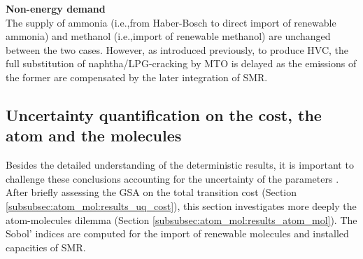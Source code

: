 \documentclass[11pt,twoside,a4paper,english]{article}
\def\ie{i.e.,}
\newcommand{\myparagraph}[1]{{\vspace{0cm}\textbf{#1}\vspace{-0.3cm}}}
\begin{document}
\myparagraph{Non-energy demand}\\

The supply of ammonia (\ie from Haber-Bosch to direct import of renewable ammonia) and methanol (\ie import of renewable methanol) are unchanged between the two cases. However, as introduced previously, to produce \gls{HVC}, the full substitution of naphtha/LPG-cracking by \gls{MTO} is delayed as the emissions of the former are compensated by the later integration of \gls{SMR}.

\subsection{Uncertainty quantification on the cost, the atom and the molecules}
\label{subsec:atom_mol:results_uq}
Besides the detailed understanding of the deterministic results, it is important to challenge these conclusions accounting for the uncertainty of the parameters \cite{guevara2020machine}. After briefly assessing the \acrfull{GSA} on the total transition cost (Section \ref{subsubsec:atom_mol:results_uq_cost}), this section investigates more deeply the atom-molecules dilemma (Section \ref{subsubsec:atom_mol:results_atom_mol}). The Sobol' indices are computed for the import of renewable molecules and installed capacities of \gls{SMR}.
\end{document}
